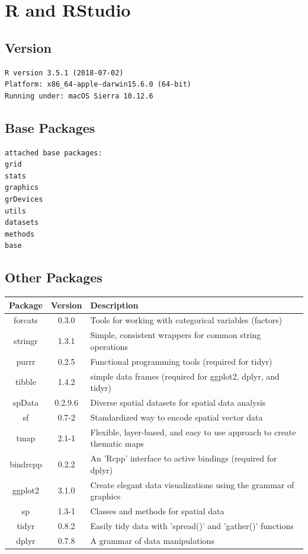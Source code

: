 \documentclass{report}
\begin{document}
\chapter{R and RStudio}
\label{cha:RStudio}

\section{Version}
\label{sec:RVersion}
\begin{verbatim}
R version 3.5.1 (2018-07-02)
Platform: x86_64-apple-darwin15.6.0 (64-bit)
Running under: macOS Sierra 10.12.6
\end{verbatim}

\section{Base Packages}
\label{sec:Base}
\begin{verbatim}
attached base packages:
grid		
stats	
graphics		
grDevices	
utils	
datasets		
methods		
base     
\end{verbatim}

\section{Other Packages}
\label{sec:Other}
\begin{tabular}{| c | c | l |}
\hline
Package & Version & Description\\
\hline
forcats & 0.3.0 & Tools for working with categorical variables (factors)\\
\hline
stringr & 1.3.1 & Simple, consistent wrappers for common string operations\\
\hline
purrr & 0.2.5 & Functional programming tools (required for tidyr)\\
\hline
tibble & 1.4.2 & simple data frames (required for ggplot2, dplyr, and tidyr)\\
\hline
spData & 0.2.9.6 & Diverse spatial datasets for spatial data analysis\\
\hline
sf & 0.7-2 & Standardized way to encode spatial vector data\\
\hline
tmap & 2.1-1 & Flexible, layer-based, and easy to use approach to create thematic maps\\
\hline
bindrcpp & 0.2.2 & An 'Rcpp' interface to active bindings (required for dplyr)\\
\hline
ggplot2 & 3.1.0 & Create elegant data visualizations using the grammar of graphics\\
\hline
sp & 1.3-1 & Classes and methods for spatial data\\
\hline
tidyr & 0.8.2 & Easily tidy data with 'spread()' and 'gather()' functions\\
\hline
dplyr & 0.7.8 & A grammar of data manipulations\\
\hline
\end{tabular}
\end{document}
